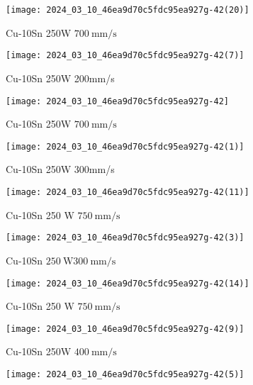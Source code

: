 \documentclass[10pt]{article}
\begin{document}
\begin{center}
\texttt{[image: 2024\_03\_10\_46ea9d70c5fdc95ea927g-42(20)]}
\end{center}

Cu-10Sn 250W $700 \mathrm{~mm} / \mathrm{s}$

\begin{center}
\texttt{[image: 2024\_03\_10\_46ea9d70c5fdc95ea927g-42(7)]}
\end{center}

Cu-10Sn 250W 200mm/s

\begin{center}
\texttt{[image: 2024\_03\_10\_46ea9d70c5fdc95ea927g-42]}
\end{center}

Cu-10Sn 250W $700 \mathrm{~mm} / \mathrm{s}$

\begin{center}
\texttt{[image: 2024\_03\_10\_46ea9d70c5fdc95ea927g-42(1)]}
\end{center}

Cu-10Sn 250W 300mm/s

\begin{center}
\texttt{[image: 2024\_03\_10\_46ea9d70c5fdc95ea927g-42(11)]}
\end{center}

Cu-10Sn 250 W $750 \mathrm{~mm} / \mathrm{s}$

\begin{center}
\texttt{[image: 2024\_03\_10\_46ea9d70c5fdc95ea927g-42(3)]}
\end{center}

Cu-10Sn $250 \mathrm{~W} 300 \mathrm{~mm} / \mathrm{s}$

\begin{center}
\texttt{[image: 2024\_03\_10\_46ea9d70c5fdc95ea927g-42(14)]}
\end{center}

Cu-10Sn 250 W $750 \mathrm{~mm} / \mathrm{s}$

\begin{center}
\texttt{[image: 2024\_03\_10\_46ea9d70c5fdc95ea927g-42(9)]}
\end{center}

Cu-10Sn 250W $400 \mathrm{~mm} / \mathrm{s}$

\begin{center}
\texttt{[image: 2024\_03\_10\_46ea9d70c5fdc95ea927g-42(5)]}
\end{center}
\end{document}
